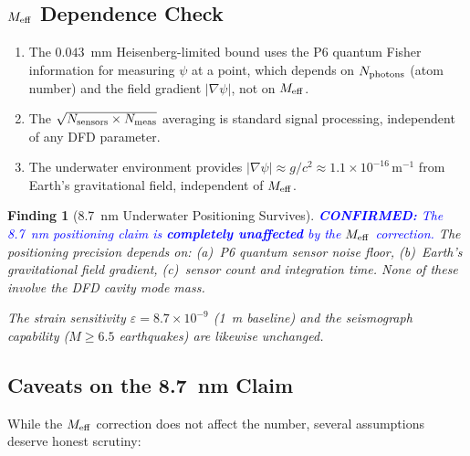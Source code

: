 \documentclass[aps,prd,twocolumn,superscriptaddress,nofootinbib]{revtex4-2}
\newcommand{\confirmed}[1]{\textcolor{blue}{\textbf{CONFIRMED:} #1}}
\newtheorem{finding}{Finding}
\begin{document}
\subsection{$M_{\rm eff}$ Dependence Check}

\begin{enumerate}
\item The $0.043$~mm Heisenberg-limited bound uses the P6 quantum
  Fisher information for measuring $\psi$ at a point, which depends
  on $N_{\rm photons}$ (atom number) and the field gradient $|\nabla\psi|$,
  not on $M_{\rm eff}$.
\item The $\sqrt{N_{\rm sensors} \times N_{\rm meas}}$ averaging is
  standard signal processing, independent of any DFD parameter.
\item The underwater environment provides $|\nabla\psi| \approx g/c^2
  \approx 1.1\times10^{-16}\,\mathrm{m}^{-1}$ from Earth's gravitational
  field, independent of $M_{\rm eff}$.
\end{enumerate}

\begin{finding}[8.7~nm Underwater Positioning Survives]
\label{find:87nm}
\confirmed{The 8.7~nm positioning claim is \textbf{completely unaffected}
by the $M_{\rm eff}$ correction.} The positioning precision depends on:
(a)~P6 quantum sensor noise floor, (b)~Earth's gravitational field
gradient, (c)~sensor count and integration time. None of these involve
the DFD cavity mode mass.

The strain sensitivity $\varepsilon = 8.7\times10^{-9}$ (1~m baseline)
and the seismograph capability ($M \geq 6.5$ earthquakes) are likewise
unchanged.
\end{finding}

\subsection{Caveats on the 8.7~nm Claim}

While the $M_{\rm eff}$ correction does not affect the number, several
assumptions deserve honest scrutiny:
\end{document}
